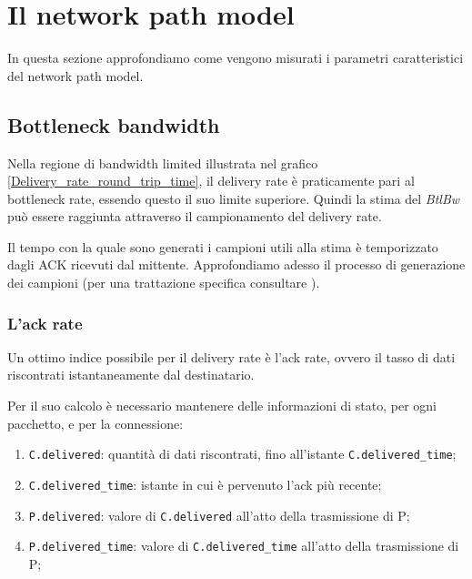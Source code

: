 \section{Il network path model}

In questa sezione approfondiamo come vengono misurati i parametri caratteristici del network path model.

\subsection{Bottleneck bandwidth} 

Nella regione di bandwidth limited illustrata nel grafico \ref{Delivery_rate_round_trip_time}, il delivery rate è praticamente pari al bottleneck rate, essendo questo il suo limite superiore. Quindi la stima del \textit{BtlBw} può essere raggiunta attraverso il campionamento del delivery rate. \bigskip

Il tempo con la quale sono generati i campioni utili alla stima è temporizzato dagli ACK ricevuti dal mittente.
Approfondiamo adesso il processo di generazione dei campioni (per una trattazione specifica consultare \cite{ietf:draft-cheng-iccrg-delivery-rate-estimation-00}). \bigskip

\subsubsection{L'ack rate}

Un ottimo indice possibile per il delivery rate è l'ack rate, ovvero il tasso di dati riscontrati istantaneamente dal destinatario. \bigskip

Per il suo calcolo è necessario mantenere delle informazioni di stato, per ogni pacchetto, e per la connessione:

\begin{enumerate}

\item \texttt{C.delivered}: quantità di dati riscontrati, fino all’istante \texttt{C.delivered\_time};

\item \texttt{C.delivered\_time}: istante in cui è pervenuto l’ack più recente;

\item \texttt{P.delivered}: valore di \texttt{C.delivered} all’atto della trasmissione di P;

\item \texttt{P.delivered\_time}: valore di \texttt{C.delivered\_time} all’atto della trasmissione di P;

\end{enumerate}


